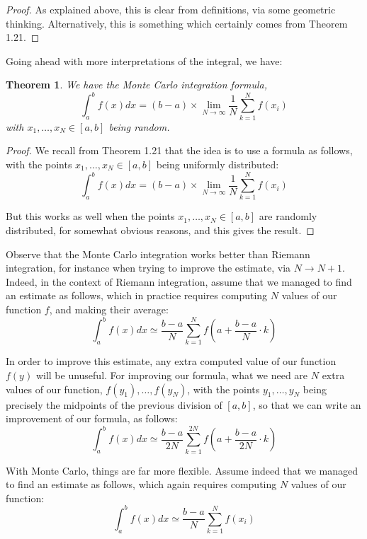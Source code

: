 \documentclass[12pt]{amsbook}
\newtheorem{theorem}{Theorem}[chapter]
\begin{document}
\begin{proof}
As explained above, this is clear from definitions, via some geometric thinking. Alternatively, this is something which certainly comes from Theorem 1.21.
\end{proof}

Going ahead with more interpretations of the integral, we have:


\begin{theorem}
We have the Monte Carlo integration formula,
$$\int_a^bf(x)dx=(b-a)\times\lim_{N\to\infty}\frac{1}{N}\sum_{k=1}^Nf(x_i)$$
with $x_1,\ldots,x_N\in[a,b]$ being random.
\end{theorem}

\begin{proof}
We recall from Theorem 1.21 that the idea is to use a formula as follows, with the points $x_1,\ldots,x_N\in[a,b]$ being uniformly distributed: 
$$\int_a^bf(x)dx=(b-a)\times\lim_{N\to\infty}\frac{1}{N}\sum_{k=1}^Nf(x_i)$$

But this works as well when the points $x_1,\ldots,x_N\in[a,b]$ are randomly distributed, for somewhat obvious reasons, and this gives the result.
\end{proof}

Observe that the Monte Carlo integration works better than Riemann integration, for instance when trying to improve the estimate, via $N\to N+1$. Indeed, in the context of Riemann integration, assume that we managed to find an estimate as follows, which in practice requires computing $N$ values of our function $f$, and making their average:
$$\int_a^bf(x)dx\simeq\frac{b-a}{N}\sum_{k=1}^Nf\left(a+\frac{b-a}{N}\cdot k\right)$$

In order to improve this estimate, any extra computed value of our function $f(y)$ will be unuseful. For improving our formula, what we need are $N$ extra values of our function, $f(y_1),\ldots,f(y_N)$, with the points $y_1,\ldots,y_N$ being precisely the midpoints of the previous division of $[a,b]$, so that we can write an improvement of our formula, as follows:
$$\int_a^bf(x)dx\simeq\frac{b-a}{2N}\sum_{k=1}^{2N}f\left(a+\frac{b-a}{2N}\cdot k\right)$$

With Monte Carlo, things are far more flexible. Assume indeed that we managed to find an estimate as follows, which again requires computing $N$ values of our function:
$$\int_a^bf(x)dx\simeq\frac{b-a}{N}\sum_{k=1}^Nf(x_i)$$
\end{document}
